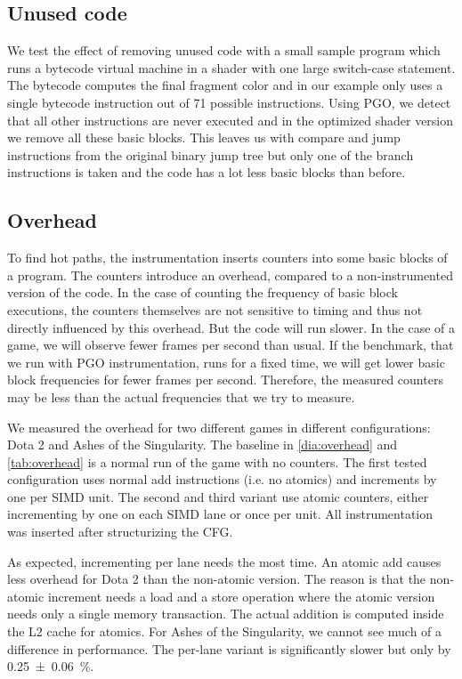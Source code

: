 \subsection{Unused code}
\label{sub:evaluation_unused}
We test the effect of removing unused code with a small sample program which runs a bytecode virtual machine in a shader with one large switch-case statement.
The bytecode computes the final fragment color and in our example only uses a single bytecode instruction out of 71 possible instructions.
Using PGO, we detect that all other instructions are never executed and in the optimized shader version we remove all these basic blocks.
This leaves us with compare and jump instructions from the original binary jump tree but only one of the branch instructions is taken and the code has a lot less basic blocks than before.

\subsection{Overhead}
\label{sub:overhead}
To find hot paths, the instrumentation inserts counters into some basic blocks of a program. The counters introduce an overhead, compared to a non-instrumented version of the code.
In the case of counting the frequency of basic block executions, the counters themselves are not sensitive to timing and thus not directly influenced by this overhead.
But the code will run slower. In the case of a game, we will observe fewer frames per second than usual.
If the benchmark, that we run with PGO instrumentation, runs for a fixed time, we will get lower basic block frequencies for fewer frames per second.
Therefore, the measured counters may be less than the actual frequencies that we try to measure.

We measured the overhead for two different games in different configurations: Dota 2 and Ashes of the Singularity. The baseline in \cref{dia:overhead} and \cref{tab:overhead} is a normal run of the game with no counters.
The first tested configuration uses normal add instructions (i.e. no atomics) and increments by one per SIMD unit.
The second and third variant use atomic counters, either incrementing by one on each SIMD lane or once per unit.
All instrumentation was inserted after structurizing the CFG.

As expected, incrementing per lane needs the most time. An atomic add causes less overhead for Dota 2 than the non-atomic version.
The reason is that the non-atomic increment needs a load and a store operation where the atomic version needs only a single memory transaction. The actual addition is computed inside the L2 cache for atomics.
For Ashes of the Singularity, we cannot see much of a difference in performance. The per-lane variant is significantly slower but only by \SI{0.25 \pm 0.06}{\percent}.

